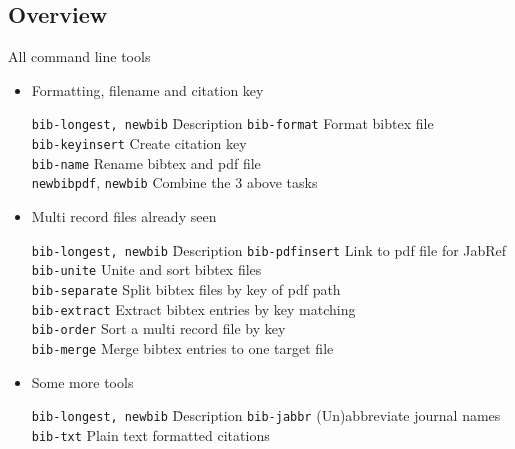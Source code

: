 \documentclass[xcolor={table,dvipsnames}]{beamer}
\begin{document}
\subsection{Overview}
\begin{frame}{All command line tools}
  \vspace{-3pt}
  \begin{itemize}
    \itemsep-10pt

    \item Formatting, filename and citation key
      \begin{tabbing}
        \texttt{bib-longest, newbib} \= Description \kill
        \texttt{bib-format} \> Format bibtex file \\
        \texttt{bib-keyinsert} \> Create citation key \\
        \texttt{bib-name} \> Rename bibtex and pdf file \\
        \alert<1>{\texttt{newbibpdf}}, \texttt{newbib} \> Combine the 3 above tasks \\
      \end{tabbing}

    \item Multi record files
	\hfill\alert{already seen}\quad\hbox{\,}
      \begin{tabbing}
        \texttt{bib-longest, newbib} \= Description \kill
        \alert{\texttt{bib-pdfinsert}} \> Link to pdf file for JabRef \\
        \alert{\texttt{bib-unite}} \> Unite and sort bibtex files \\
        \alert{\texttt{bib-separate}} \> Split bibtex files by key of pdf path \\
        \texttt{bib-extract} \> Extract bibtex entries by key matching \\
        \texttt{bib-order} \> Sort a multi record file by key \\
        \texttt{bib-merge} \> Merge bibtex entries to one target file \\
      \end{tabbing}

    \item Some more tools
      \begin{tabbing}
        \texttt{bib-longest, newbib} \= Description \kill
        \texttt{bib-jabbr} \> (Un)abbreviate journal names \\
        \texttt{bib-txt} \> Plain text formatted citations \\
      \end{tabbing}

    \end{itemize}
\end{frame}
\end{document}
